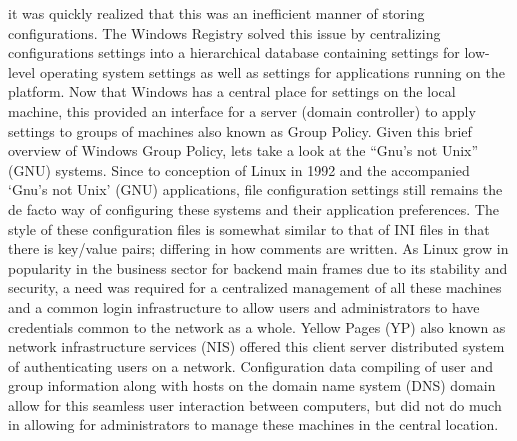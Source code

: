 \begin{multicols}{2}
			it was quickly realized that this was an inefficient manner of storing configurations.  The Windows Registry solved this issue 
			by centralizing configurations settings into a hierarchical database containing settings for low-level operating system settings 
			as well as settings for applications running on the platform.  
			\newline
			\newline
			Now that Windows has a central place for settings on the local machine, this provided an interface for a server (domain controller) 
			to apply settings to groups of machines also known as Group Policy. 
			\newline
			\newline
			Given this brief overview of Windows Group Policy, lets take a look at the ``Gnu’s not Unix'' (GNU) systems. 
			Since to conception of Linux in 1992 and the accompanied ‘Gnu’s not Unix’ (GNU) applications, file configuration settings still
		    remains the de facto way of configuring these systems and their application preferences.   The style of these configuration files 
		    is somewhat similar to that of INI files in that there is key/value pairs; differing in how comments are written.
			\newline
			\newline
			As Linux grow in popularity in the business sector for backend main frames due to its stability and security, a need was required 
			for a centralized management of all these machines and a common login infrastructure to allow users and administrators to have
			credentials common to the network as a whole.  Yellow Pages (YP) also known as network infrastructure services (NIS) offered 
			this client server distributed system of authenticating users on a network.  
			\newline
			\newline
			Configuration data compiling of user and group information along with hosts on the domain name system (DNS) domain allow for 
			this seamless user interaction between computers, but did not do much in allowing for administrators to manage these machines 
			in the central location.
			\newline
			\newline

\end{multicols}
